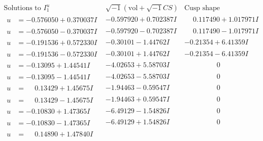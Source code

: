 \documentclass[1p]{elsarticle_modified}
\theoremstyle{definition}
\newcommand{\I}{\sqrt{-1}}
\begin{document}
$$\begin{array}{c|c|c}
\text{Solutions to }I^u_{1}& \I (\text{vol} + \sqrt{-1}CS) & \text{Cusp shape}\\
 \hline 
\begin{aligned}
u &= -0.576050 + 0.370037 I\end{aligned}
 & -0.597920 + 0.702387 I & \phantom{-}0.117490 + 1.017971 I \\ \hline\begin{aligned}
u &= -0.576050 - 0.370037 I\end{aligned}
 & -0.597920 - 0.702387 I & \phantom{-}0.117490 - 1.017971 I \\ \hline\begin{aligned}
u &= -0.191536 + 0.572330 I\end{aligned}
 & -0.30101 - 1.44762 I & -0.21354 + 6.41359 I \\ \hline\begin{aligned}
u &= -0.191536 - 0.572330 I\end{aligned}
 & -0.30101 + 1.44762 I & -0.21354 - 6.41359 I \\ \hline\begin{aligned}
u &= -0.13095 + 1.44541 I\end{aligned}
 & -4.02653 + 5.58703 I & \phantom{-0.000000 } 0 \\ \hline\begin{aligned}
u &= -0.13095 - 1.44541 I\end{aligned}
 & -4.02653 - 5.58703 I & \phantom{-0.000000 } 0 \\ \hline\begin{aligned}
u &= \phantom{-}0.13429 + 1.45675 I\end{aligned}
 & -1.94463 - 0.59547 I & \phantom{-0.000000 } 0 \\ \hline\begin{aligned}
u &= \phantom{-}0.13429 - 1.45675 I\end{aligned}
 & -1.94463 + 0.59547 I & \phantom{-0.000000 } 0 \\ \hline\begin{aligned}
u &= -0.10830 + 1.47365 I\end{aligned}
 & -6.49129 - 1.54826 I & \phantom{-0.000000 } 0 \\ \hline\begin{aligned}
u &= -0.10830 - 1.47365 I\end{aligned}
 & -6.49129 + 1.54826 I & \phantom{-0.000000 } 0 \\ \hline\begin{aligned}
u &= \phantom{-}0.14890 + 1.47840 I\end{aligned}

\end{array}$$
\end{document}
